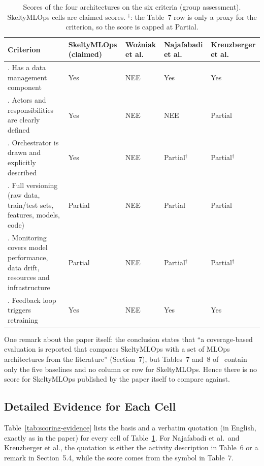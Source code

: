 \begin{table}[htbp]
\centering
\small
\caption{Scores of the four architectures on the six criteria (group assessment). SkeltyMLOps cells are claimed scores. $^{\dagger}$: the Table~7 row is only a proxy for the criterion, so the score is capped at Partial.}
\label{tab:scoring-summary}
\begin{tabular}{@{}>{\raggedright\arraybackslash}p{3.9cm} >{\centering\arraybackslash}p{2.5cm} >{\centering\arraybackslash}p{2.2cm} >{\centering\arraybackslash}p{2.2cm} >{\centering\arraybackslash}p{2.3cm}@{}}
\toprule
Criterion & SkeltyMLOps (claimed) & Wo\'{z}niak et al. & Najafabadi et al. & Kreuzberger et al. \\
\midrule
1. Has a data management component & Yes & NEE & Yes & Yes \\
2. Actors and responsibilities are clearly defined & Yes & NEE & NEE & Partial \\
3. Orchestrator is drawn and explicitly described & Yes & NEE & Partial$^{\dagger}$ & Partial$^{\dagger}$ \\
4. Full versioning (raw data, train/test sets, features, models, code) & Partial & NEE & Partial & Partial \\
5. Monitoring covers model performance, data drift, resources and infrastructure & Partial & NEE & Partial$^{\dagger}$ & Partial$^{\dagger}$ \\
6. Feedback loop triggers retraining & Yes & NEE & Yes & Yes \\
\bottomrule
\end{tabular}
\end{table}

One remark about the paper itself: the conclusion states that ``a coverage-based evaluation is reported that compares SkeltyMLOps with a set of MLOps architectures from the literature'' (Section~7), but Tables~7 and~8 of~\papercite{} contain only the five baselines and no column or row for SkeltyMLOps. Hence there is no score for SkeltyMLOps published by the paper itself to compare against.

\subsection{Detailed Evidence for Each Cell}

Table~\ref{tab:scoring-evidence} lists the basis and a verbatim quotation (in English, exactly as in the paper) for every cell of Table~\ref{tab:scoring-summary}. For Najafabadi et al.\ and Kreuzberger et al., the quotation is either the activity description in Table~6 or a remark in Section~5.4, while the score comes from the symbol in Table~7.

